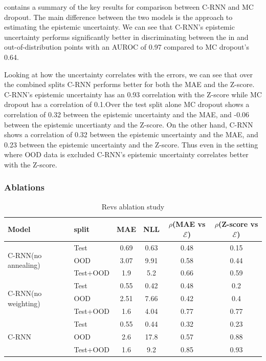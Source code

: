  contains a summary of the key results for comparison between C-RNN and MC dropout. The main difference between the two models is the approach to estimating the epistemic uncertainty. We can see that C-RNN's epistemic uncertainty performs significantly better in discriminating between the in and out-of-distribution points with an AUROC of 0.97 compared to MC dropout's 0.64.

Looking at how the uncertainty correlates with the errors, we can see that over the combined splits C-RNN performs better for both the MAE and the Z-score. C-RNN's epistemic uncertainty has an 0.93 correlation with the Z-score while MC dropout has a correlation of 0.1.Over the test split alone MC dropout shows a correlation of 0.32 between the epistemic uncertainty and the MAE, and -0.06 between the epistemic uncertianty and the Z-score. On the other hand, C-RNN shows a correlation of 0.32 between the epistemic uncertainty and the MAE, and 0.23 between the epistemic uncertainty and the Z-score. Thus even in the setting where OOD data is excluded C-RNN's epistemic uncertainty correlates better with the Z-score.    
 



\subsubsection{Ablations}

\begin{table}[htbp]
\centering
    \begin{tabular}{l l c c c c }  
        \toprule
        Model & split & MAE & NLL & $\rho$(MAE vs $\mathcal{E}$) &
        $\rho$(Z-score vs $\mathcal{E}$)\\
        \midrule
        \multirow{3}{*}{C-RNN(no annealing)} 
            & Test     & 0.69 & 0.63 & 0.48  & 0.15\\  
            & OOD      & 3.07 & 9.91 & 0.58  & 0.44\\  
            & Test+OOD & 1.9  & 5.2  & 0.66  & 0.59\\ 

        \midrule
        \multirow{3}{*}{C-RNN(no weighting)} 
            & Test     & 0.55 & 0.42  & 0.48  & 0.2\\  
            & OOD      & 2.51 & 7.66  & 0.42  & 0.4 \\  
            & Test+OOD & 1.6  & 4.04  & 0.77  & 0.77\\ 
            
        \midrule
        \multirow{3}{*}{C-RNN} 
            & Test     & 0.55& 0.44 & 0.32  & 0.23\\  
            & OOD      & 2.6 & 17.8 & 0.57  & 0.88\\  
            & Test+OOD & 1.6 & 9.2  & 0.85  & 0.93\\ 

        \toprule
    \end{tabular}
    \caption{Revs ablation study}
    \label{tbl:revs_ablation}
\end{table}


